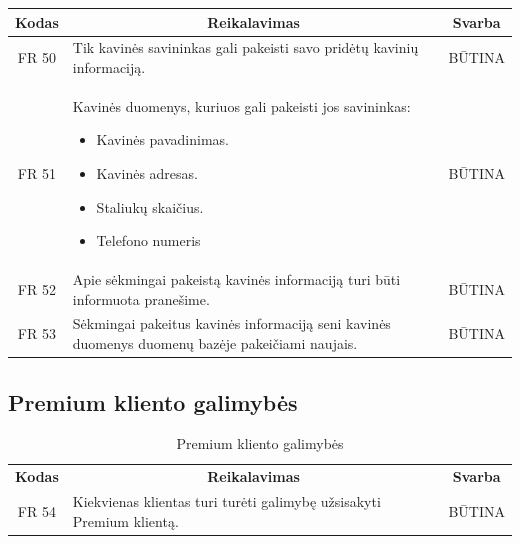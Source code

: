 \documentclass{VUMIFPSkursinis}
\begin{document}
{{{{{\begin{center}
\begin{table}[H]
\begin{tabular}{|p{2cm}|p{}|p{}|}
	\hline
		\multicolumn{1}{|c|}{{\bfseries Kodas}}&
		\multicolumn{1}{|c|}{{\bfseries Reikalavimas}}&
		\multicolumn{1}{|c|}{{\bfseries Svarba}}\\
	\hline 	
		\multicolumn{1}{|c|}{FR 50}&
		{Tik kavinės savininkas gali pakeisti savo pridėtų kavinių informaciją.}&
		\multicolumn{1}{|c|}{BŪTINA}\\
	
	\hline 	
		\multicolumn{1}{|c|}{FR 51}&
		{Kavinės duomenys, kuriuos gali pakeisti jos savininkas:
		\begin{itemize}
			\item Kavinės pavadinimas.
			\item Kavinės adresas.
			\item Staliukų skaičius.
			\item Telefono numeris
		\end{itemize}}&
		\multicolumn{1}{|c|}{BŪTINA}\\
	
	\hline 	
		\multicolumn{1}{|c|}{FR 52}&
		{Apie sėkmingai pakeistą kavinės informaciją turi būti informuota pranešime.}&
		\multicolumn{1}{|c|}{BŪTINA}\\
	
	\hline 	
		\multicolumn{1}{|c|}{FR 53}&
		{Sėkmingai pakeitus kavinės informaciją seni kavinės duomenys duomenų bazėje pakeičiami naujais.}&
		\multicolumn{1}{|c|}{BŪTINA}\\
	
	\hline  
	
	
	\end{tabular}
	
	\label{table:Kavinėsinformacijoskeitimas}	
	\end{table}

\end{center}

\subsection{Premium kliento galimybės}

\begin{center}
	\begin{table}[H]
	\caption{Premium kliento galimybės}
	\begin{tabular}{|p{2cm}|p{}|p{}|}
	\hline
	    \rowcolor{lightgray}
		\multicolumn{3}{|c|}{Premium kliento galimybės}\\
		
	\hline
		\multicolumn{1}{|c|}{{\bfseries Kodas}}&
		\multicolumn{1}{|c|}{{\bfseries Reikalavimas}}&
		\multicolumn{1}{|c|}{{\bfseries Svarba}}\\
	\hline 	
		\multicolumn{1}{|c|}{FR 54}&
		{Kiekvienas klientas turi turėti galimybę užsisakyti Premium klientą.}&
		\multicolumn{1}{|c|}{BŪTINA}\\
				

\end{tabular}
\end{table}
\end{center}}}}}}
\end{document}
